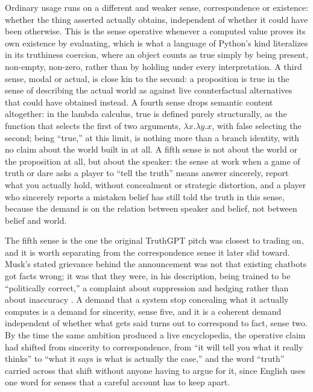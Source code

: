 \documentclass[11pt]{article}
\begin{document}
Ordinary usage runs on a different and weaker sense, correspondence or existence: whether the thing asserted actually obtains, independent of whether it could have been otherwise. This is the sense operative whenever a computed value proves its own existence by evaluating, which is what a language of Python's kind literalizes in its truthiness coercion, where an object counts as true simply by being present, non-empty, non-zero, rather than by holding under every interpretation. A third sense, modal or actual, is close kin to the second: a proposition is true in the sense of describing the actual world as against live counterfactual alternatives that could have obtained instead. A fourth sense drops semantic content altogether: in the lambda calculus, true is defined purely structurally, as the function that selects the first of two arguments, $\lambda x.\lambda y. x$, with false selecting the second; being ``true,'' at this limit, is nothing more than a branch identity, with no claim about the world built in at all. A fifth sense is not about the world or the proposition at all, but about the speaker: the sense at work when a game of truth or dare asks a player to ``tell the truth'' means answer sincerely, report what you actually hold, without concealment or strategic distortion, and a player who sincerely reports a mistaken belief has still told the truth in this sense, because the demand is on the relation between speaker and belief, not between belief and world.

The fifth sense is the one the original TruthGPT pitch was closest to trading on, and it is worth separating from the correspondence sense it later slid toward. Musk's stated grievance behind the announcement was not that existing chatbots got facts wrong; it was that they were, in his description, being trained to be ``politically correct,'' a complaint about suppression and hedging rather than about inaccuracy \citep{cnbc2023truthgpt}. A demand that a system stop concealing what it actually computes is a demand for sincerity, sense five, and it is a coherent demand independent of whether what gets said turns out to correspond to fact, sense two. By the time the same ambition produced a live encyclopedia, the operative claim had shifted from sincerity to correspondence, from ``it will tell you what it really thinks'' to ``what it says is what is actually the case,'' and the word ``truth'' carried across that shift without anyone having to argue for it, since English uses one word for senses that a careful account has to keep apart.
\end{document}
